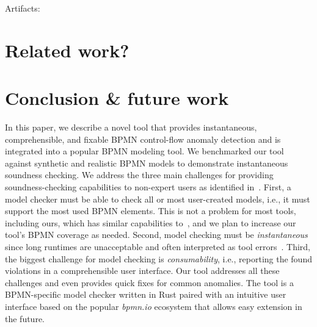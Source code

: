 \documentclass[
]{ceurart}
\begin{document}
Artifacts: \cite{timkrauterBPM2024Artifacts2024}

\section{Related work?} \label{sec:related-work}


\section{Conclusion \& future work} \label{sec:conclusion}

In this paper, we describe a novel tool that provides instantaneous, comprehensible, and fixable BPMN control-flow anomaly detection and is integrated into a popular BPMN modeling tool.
We benchmarked our tool against synthetic and realistic BPMN models to demonstrate instantaneous soundness checking.
We address the three main challenges for providing soundness-checking capabilities to non-expert users as identified in~\cite{fahlandAnalysisDemandInstantaneous2011}.
First, a model checker must be able to check all or most user-created models, i.e., it must support the most used BPMN elements.
This is not a problem for most tools, including ours, which has similar capabilities to~\cite{corradiniFormalApproachAnalysis2021}, and we plan to increase our tool's BPMN coverage as needed.
Second, model checking must be \textit{instantaneous} since long runtimes are unacceptable and often interpreted as tool errors~\cite{fahlandAnalysisDemandInstantaneous2011}.
Third, the biggest challenge for model checking is \textit{consumability}, i.e., reporting the found violations in a comprehensible user interface.
Our tool addresses all these challenges and even provides quick fixes for common anomalies.
The tool is a BPMN-specific model checker written in Rust paired with an intuitive user interface based on the popular \textit{bpmn.io} ecosystem that allows easy extension in the future.



\end{document}
